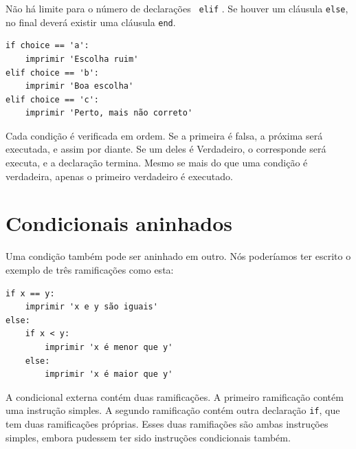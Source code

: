 Não há limite para o número de declarações {\tt
elif} . Se houver um cláusula {\tt else}, no final deverá
existir uma cláusula {\tt end}.




\beforeverb
\begin{verbatim}
if choice == 'a':
    imprimir 'Escolha ruim'
elif choice == 'b':
    imprimir 'Boa escolha'
elif choice == 'c':
    imprimir 'Perto, mais não correto'
\end{verbatim}
\afterverb
%

Cada condição é verificada em ordem. Se a primeira é falsa,
a próxima será executada, e assim por diante. Se um deles é
Verdadeiro, o corresponde será executa, e a declaração
termina. Mesmo se mais do que uma condição é verdadeira, apenas o
primeiro verdadeiro é executado.




\section{Condicionais aninhados}

Uma condição também pode ser aninhado em outro. Nós poderíamos ter
escrito o exemplo de três ramificações como esta:


\beforeverb
\begin{verbatim}
if x == y:
    imprimir 'x e y são iguais'
else:
    if x < y:
        imprimir 'x é menor que y'
    else:
        imprimir 'x é maior que y'
\end{verbatim}
\afterverb
%
A condicional externa contém duas ramificações. A
primeiro ramificação contém uma instrução simples. A segundo ramificação
contém outra declaração {\tt if}, que tem duas ramificações
próprias. Esses duas ramifiações são ambas instruções simples,
embora pudessem ter sido instruções condicionais também.

